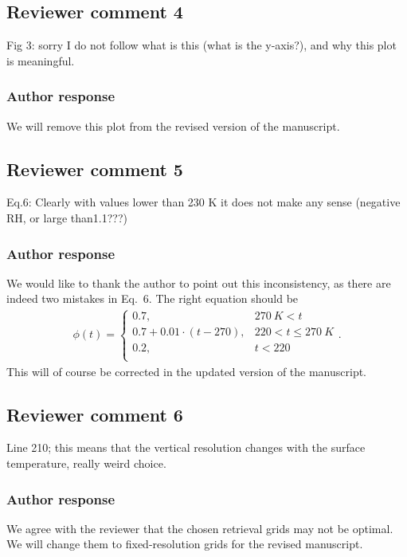 \documentclass[11pt]{scrartcl}
\begin{document}
\subsection*{Reviewer comment 4}

Fig 3: sorry I do not follow what is this (what is the y-axis?), and why this plot is meaningful.

\subsubsection*{Author response}

We will remove this plot from the revised version of the manuscript.


\subsection*{Reviewer comment 5}
Eq.6: Clearly with values lower than 230 K it does not make any sense (negative RH, or large than1.1???)

\subsubsection*{Author response}

We would like to thank the author to point out this inconsistency, as there are indeed two mistakes
in Eq.~6. The right equation should be
\begin{align}
\phi(t) = \begin{cases}
 0.7, & 270\ \unit{K} < t \\
 0.7 + 0.01 \cdot (t - 270), &220 < t \leq  270\ \unit{K} \\
 0.2,  & t < 220 \\
 \end{cases}.
\end{align}
This will of course be corrected in the updated version of the manuscript.

\subsection*{Reviewer comment 6}
Line 210; this means that the vertical resolution changes with the surface temperature, really weird choice.

\subsubsection*{Author response}

We agree with the reviewer that the chosen retrieval grids may not be optimal.
We will change them to fixed-resolution grids for the revised manuscript.
\end{document}
